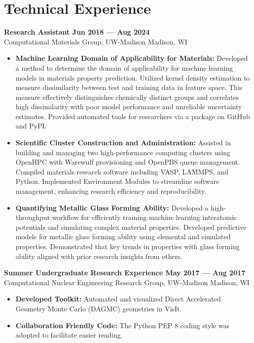 \section{Technical Experience}

\noindent \textbf{Research Assistant \hfill Jun 2018 --- Aug 2024}\\
Computational Materials Group, UW-Madison \dotfill Madison, WI

\begin{itemize}
    \item \textbf{Machine Learning Domain of Applicability for Materials:} Developed a method to determine the domain of applicability for machine learning models in materials property prediction. Utilized kernel density estimation to measure dissimilarity between test and training data in feature space. This measure effectively distinguishes chemically distinct groups and correlates high dissimilarity with poor model performance and unreliable uncertainty estimates. Provided automated tools for researchers via a package on GitHub and PyPI.

    \item \textbf{Scientific Cluster Construction and Administration:} Assisted in building and managing two high-performance computing clusters using OpenHPC with Warewulf provisioning and OpenPBS queue management. Compiled materials research software including VASP, LAMMPS, and Python. Implemented Environment Modules to streamline software management, enhancing research efficiency and reproducibility.

    \item \textbf{Quantifying Metallic Glass Forming Ability:} Developed a high-throughput workflow for efficiently training machine learning interatomic potentials and simulating complex material properties. Developed predictive models for metallic glass forming ability using elemental and simulated properties. Demonstrated that key trends in properties with glass forming ability aligned with prior research insights from others.

\end{itemize}

\noindent \textbf{Summer Undergraduate Research Experience \hfill May 2017 --- Aug 2017}\\
Computational Nuclear Engineering Research Group, UW-Madison \dotfill Madison, WI

\begin{itemize}
    \item \textbf{Developed Toolkit:} Automated and visualized Direct Accelerated Geometry Monte Carlo (DAGMC) geometries in VisIt.
    \item \textbf{Collaboration Friendly Code:} The Python PEP 8 coding style was adopted to facilitate easier reading.
\end{itemize}

